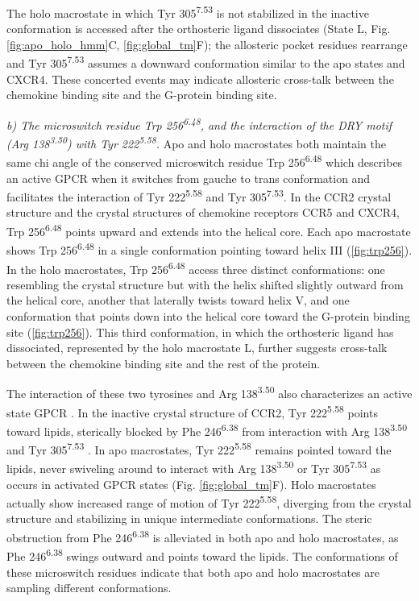 The holo macrostate in which Tyr 305\textsuperscript{7.53} is not stabilized in the inactive conformation is accessed after the orthosteric ligand dissociates (State L, Fig. \ref{fig:apo_holo_hmm}C, \ref{fig:global_tm}F); the allosteric pocket residues rearrange and Tyr 305\textsuperscript{7.53} assumes a downward conformation similar to the apo states and CXCR4.
These concerted events may indicate allosteric cross-talk between the chemokine binding site and the G-protein binding site.

\emph{b) The microswitch residue Trp 256\textsuperscript{6.48}, and the interaction of the DRY motif (Arg 138\textsuperscript{3.50}) with Tyr 222\textsuperscript{5.58}.}
Apo and holo macrostates both maintain the same chi angle of the conserved microswitch residue Trp 256\textsuperscript{6.48} which describes an active GPCR when it switches from gauche to trans conformation and facilitates the interaction of Tyr 222\textsuperscript{5.58} and Tyr 305\textsuperscript{7.53}.
In the CCR2 crystal structure and the crystal structures of chemokine receptors CCR5 and CXCR4, Trp 256\textsuperscript{6.48} points upward and extends into the helical core.
Each apo macrostate shows Trp 256\textsuperscript{6.48} in a single conformation pointing toward helix III (\cref{fig:trp256}).
In the holo macrostates, Trp 256\textsuperscript{6.48} access three distinct conformations: one resembling the crystal structure but with the helix shifted slightly outward from the helical core, another that laterally twists toward helix V, and one conformation that points down into the helical core toward the G-protein binding site (\cref{fig:trp256}). This third conformation, in which the orthosteric ligand has dissociated, represented by the holo macrostate L, further suggests cross-talk between the chemokine binding site and the rest of the protein.

The interaction of these two tyrosines and Arg 138\textsuperscript{3.50} also characterizes an active state GPCR \cite{Caliman2015}.
In the inactive crystal structure of CCR2, Tyr 222\textsuperscript{5.58} points toward lipids, sterically blocked by Phe 246\textsuperscript{6.38} from interaction with Arg 138\textsuperscript{3.50} and Tyr 305\textsuperscript{7.53} \cite{Zheng2016}.
In apo macrostates, Tyr 222\textsuperscript{5.58} remains pointed toward the lipids, never swiveling around to interact with Arg 138\textsuperscript{3.50} or Tyr 305\textsuperscript{7.53} as occurs in activated GPCR states (Fig. \ref{fig:global_tm}F).
Holo macrostates actually show increased range of motion of Tyr 222\textsuperscript{5.58}, diverging from the crystal structure and stabilizing in unique intermediate conformations.
The steric obstruction from Phe 246\textsuperscript{6.38} is alleviated in both apo and holo macrostates, as Phe 246\textsuperscript{6.38} swings outward and points toward the lipids.
The conformations of these microswitch residues indicate that both apo and holo macrostates are sampling different conformations.

